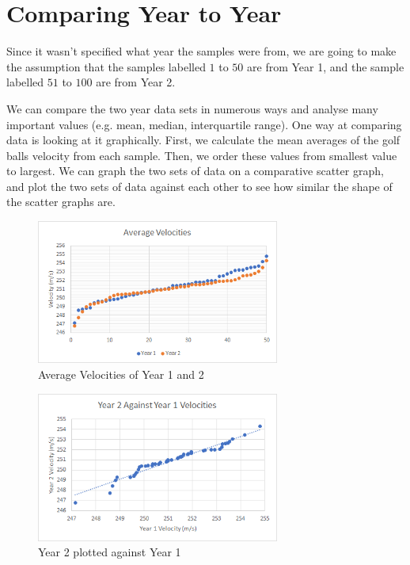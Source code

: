 \documentclass[11pt]{article}
\begin{document}
\section{Comparing Year to Year}
Since it wasn't specified what year the samples were from, we are going to make the assumption that the samples labelled $1$ to $50$ are from Year 1, and the sample labelled $51$ to $100$ are from Year 2.

We can compare the two year data sets in numerous ways and analyse many important values (e.g. mean, median, interquartile range). One way at comparing data is looking at it graphically. First, we calculate the mean averages of the golf balls velocity from each sample. Then, we order these values from smallest value to largest. We can graph the two sets of data on a comparative scatter graph, and plot the two sets of data against each other to see how similar the shape of the scatter graphs are.


\begin{figure}[H]
    \centering
    \includegraphics[width=80mm]{Average Velocities.png}
    \caption{Average Velocities of Year 1 and 2}
    \label{figure 10}
\end{figure}
\begin{figure}[H]
    \centering
    \includegraphics[width=80mm]{Scatter Graph.png}
    \caption{Year 2 plotted against Year 1}
    \label{figure 11}
\end{figure}
\end{document}
